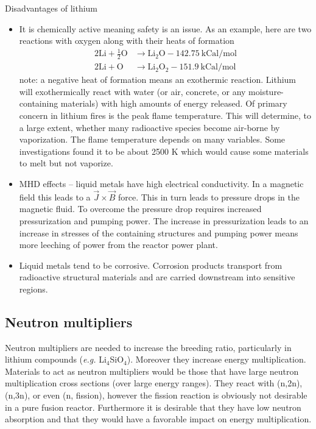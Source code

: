 \documentclass[11pt]{report} %
\begin{document}
Disadvantages of lithium
\begin{itemize}
\item {It is chemically active meaning safety is an issue. As an example, here are two reactions with oxygen along with their heats of formation
\begin{align*}
2\mathrm{Li} + \frac{1}{2}\mathrm{O} &\rightarrow \mathrm{Li}_2\mathrm{O} - 142.75~\text{kCal/mol}\\
2\mathrm{Li} + \mathrm{O} &\rightarrow \mathrm{Li}_2\mathrm{O}_2 - 151.9~\text{kCal/mol}
\end{align*}
note: a negative heat of formation means an exothermic reaction. Lithium will exothermically react with water (or air, concrete, or any moisture-containing materials) with high amounts of energy released. Of primary concern in lithium fires is the peak flame temperature. This will determine, to a large extent, whether many radioactive species become air-borne by vaporization. The flame temperature depends on many variables. Some investigations found it to be  about 2500 K which would cause some materials to melt but not vaporize.}
\item MHD effects -- liquid metals have high electrical conductivity. In a magnetic field this leads to a $\vec{J}\times\vec{B}$ force. This in turn leads to pressure drops in the magnetic fluid. To overcome the pressure drop requires increased pressurization and pumping power. The increase in pressurization leads to an increase in stresses of the containing structures and pumping power means more leeching of power from the reactor power plant.
\item Liquid metals tend to be corrosive. Corrosion products transport from radioactive structural materials and are carried downstream into sensitive regions.
\end{itemize}
\subsection{Neutron multipliers}
Neutron multipliers are needed to increase the breeding ratio, particularly in lithium compounds ({\it e.g.} Li$_4$SiO$_4$). Moreover they increase energy multiplication. Materials to act as neutron multipliers would be those that have large neutron multiplication cross sections (over large energy ranges). They react with (n,2n), (n,3n), or even (n, fission), however the fission reaction is obviously not desirable in a pure fusion reactor. Furthermore it is desirable that they have low neutron absorption and that they would have a favorable impact on energy multiplication. 
\end{document}
